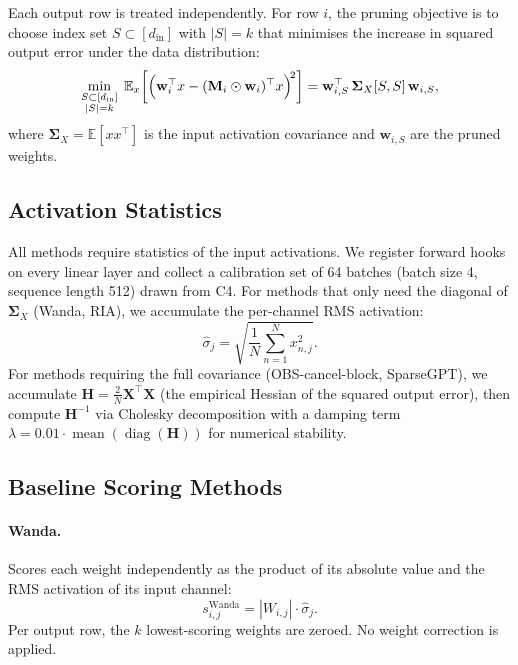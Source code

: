\documentclass{article}
\begin{document}
Each output row is treated independently. For row $i$, the pruning objective
is to choose index set $S \subset [d_\text{in}]$ with $|S| = k$ that minimises
the increase in squared output error under the data distribution:
\begin{equation}
  \min_{\substack{S \subset [d_\text{in}] \\ |S| = k}} \;
  \mathbb{E}_x \!\left[
    \Bigl(\mathbf{w}_i^\top x - (\mathbf{M}_i \odot \mathbf{w}_i)^\top x\Bigr)^{\!2}
  \right]
  = \mathbf{w}_{i,S}^\top \,\boldsymbol{\Sigma}_X[S,S]\, \mathbf{w}_{i,S},
  \label{eq:obj}
\end{equation}
where $\boldsymbol{\Sigma}_X = \mathbb{E}[xx^\top]$ is the input activation
covariance and $\mathbf{w}_{i,S}$ are the pruned weights.


\subsection{Activation Statistics}

All methods require statistics of the input activations. We register forward
hooks on every linear layer and collect a calibration set of 64 batches
(batch size 4, sequence length 512) drawn from C4. For methods that only
need the diagonal of $\boldsymbol{\Sigma}_X$ (Wanda, RIA), we accumulate the
per-channel RMS activation:
\begin{equation}
  \hat{\sigma}_j = \sqrt{\frac{1}{N}\sum_{n=1}^{N} x_{n,j}^2}.
  \label{eq:rms}
\end{equation}
For methods requiring the full covariance (OBS-cancel-block, SparseGPT), we
accumulate $\mathbf{H} = \frac{2}{N} \mathbf{X}^\top \mathbf{X}$ (the
empirical Hessian of the squared output error), then compute $\mathbf{H}^{-1}$
via Cholesky decomposition with a damping term
$\lambda = 0.01 \cdot \operatorname{mean}(\operatorname{diag}(\mathbf{H}))$
for numerical stability.


\subsection{Baseline Scoring Methods}

\paragraph{Wanda.}
Scores each weight independently as the product of its absolute value and the
RMS activation of its input channel:
\begin{equation}
  s^\mathrm{Wanda}_{i,j} = |W_{i,j}| \cdot \hat{\sigma}_j.
\end{equation}
Per output row, the $k$ lowest-scoring weights are zeroed. No weight
correction is applied.
\end{document}
